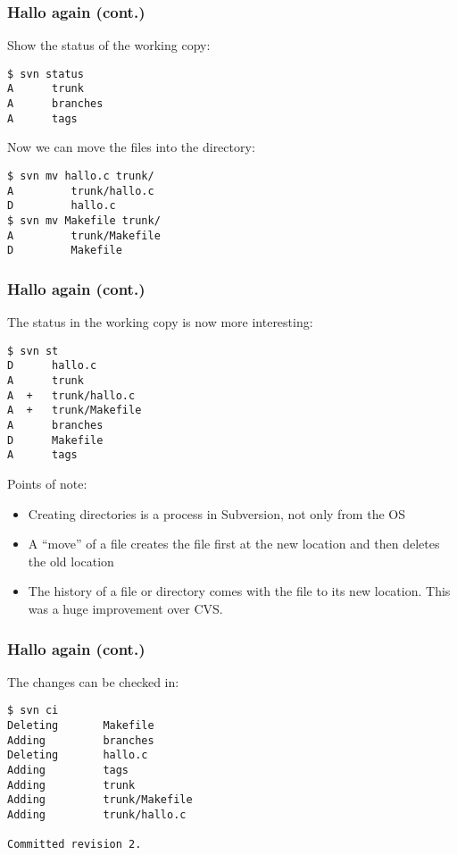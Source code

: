 \begin{frame}[fragile]
    \frametitle{Hallo again (cont.)}
    \linuxframe
    Show the status of the working copy:
\begin{lstlisting}
$ svn status
A      trunk
A      branches
A      tags
\end{lstlisting}

Now we can move the files into the  directory:
\begin{lstlisting}
$ svn mv hallo.c trunk/
A         trunk/hallo.c
D         hallo.c
$ svn mv Makefile trunk/
A         trunk/Makefile
D         Makefile
\end{lstlisting}

\end{frame}

\begin{frame}[fragile]
    \frametitle{Hallo again (cont.)}
    \linuxframe
    The status in the working copy is now more interesting:
\begin{lstlisting}
$ svn st
D      hallo.c
A      trunk
A  +   trunk/hallo.c
A  +   trunk/Makefile
A      branches
D      Makefile
A      tags
\end{lstlisting}

    Points of note:
    \begin{itemize}
        \item Creating directories is a process in Subversion, not only from the OS
        \item A \enquote{move} of a file creates the file first at the new location
            and then deletes the old location
        \item The history of a file or directory comes with the file to its new
            location.  This was a huge improvement over CVS.
    \end{itemize}
\end{frame}

\begin{frame}[fragile]
    \frametitle{Hallo again (cont.)}
    \linuxframe
    The changes can be checked in:
\begin{lstlisting}
$ svn ci
Deleting       Makefile
Adding         branches
Deleting       hallo.c
Adding         tags
Adding         trunk
Adding         trunk/Makefile
Adding         trunk/hallo.c

Committed revision 2.
\end{lstlisting}
\end{frame}

